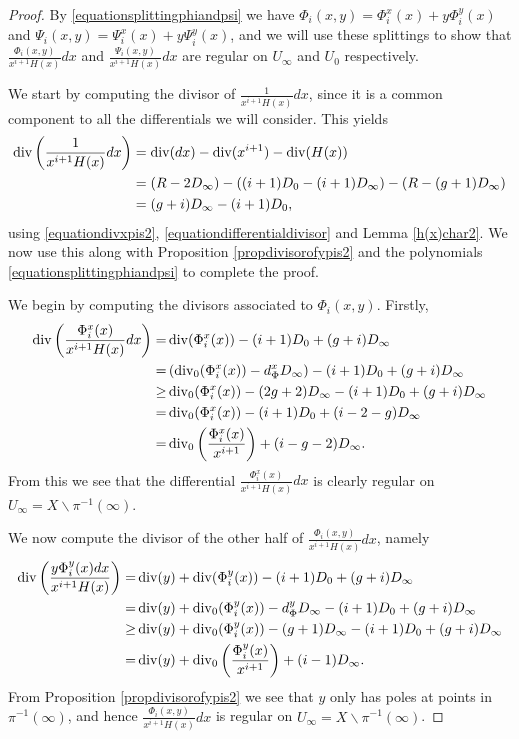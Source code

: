 \begin{proof}
    
    By \eqref{equationsplittingphiandpsi} we have $\Phi_i(x,y) = \Phi_i^x(x) + y\Phi_i^y(x)$ and $\Psi_i (x,y)= \Psi_i^x(x) + y\Psi_i^y(x)$, and we will use these splittings to show that $\frac{ \Phi_i(x,y) }{x^{i+1}H(x)}dx$ and $\frac{\Psi_i(x,y) }{x^{i+1}H(x)}dx$ are regular on $U_\infty$ and $U_0$ respectively.
    
    We start by computing the divisor of $\frac{1}{x^{i+1}H(x)}dx$, since it is a common component to all the differentials we will consider.
    This yields
        \begin{align*}
        \operatorname{div} \left( \frac{1}{x^{i+1}H(x)}dx \right) & = \operatorname{div}(dx) - \operatorname{div} (x^{i+1}) - \operatorname{div} (H(x)) \nonumber \\
        & = (R-2D_\infty) - ((i+1)D_0 - (i+1)D_\infty) - (R - (g+1)D_\infty) \nonumber \\
        & = (g+i)D_\infty - (i+1)D_0,
        \end{align*}
    using \eqref{equationdivxpis2}, \eqref{equationdifferentialdivisor}  and Lemma \ref{h(x)char2}.
    We now use this along with Proposition \ref{propdivisorofypis2} and the polynomials \eqref{equationsplittingphiandpsi} to complete the proof.
    
    We begin by computing the divisors associated to $\Phi_i(x,y)$.
    Firstly,
        \begin{align*}
        \operatorname{div} \left( \frac{\Phi_i^x(x) }{x^{i+1} H(x)}dx \right)  = &  \operatorname{div}(\Phi_i^x(x)) -(i+1)D_0 + (g+i)D_\infty\\
         = & \left( \operatorname{div}_0(\Phi_i^x(x)) -d_\Phi^xD_\infty\right) -(i+1)D_0 + (g+i)D_\infty\\
         \geq & \operatorname{div}_0(\Phi_i^x(x)) - (2g+2)D_\infty - (i+1)D_0 + (g+i)D_\infty \\
         = &  \operatorname{div}_0(\Phi_i^x(x)) - (i+1)D_0 + (i-2-g)D_\infty \\
         =  & \operatorname{div}_0 \left( \frac{\Phi_i^x(x)}{x^{i+1}} \right) + (i-g-2)D_\infty.
        \end{align*}
    From this we see that the differential $\frac{\Phi_i^x(x)}{x^{i+1}H(x)}dx$ is clearly regular on $U_\infty = X \backslash \pi^{-1}(\infty)$.
    
    We now compute the divisor of the other half of $\frac{\Phi_i(x,y)}{x^{i+1}H(x)}dx$, namely
        \begin{align*}
        \operatorname{div}\left(\frac{y\Phi_i^y(x) dx}{x^{i+1}H(x)} \right)  = & \operatorname{div}(y) + \operatorname{div}(\Phi_i^y(x)) -(i+1)D_0 + (g+i)D_\infty\\
         = & \operatorname{div}(y) + \operatorname{div}_0(\Phi_i^y(x)) - d_\Phi^yD_\infty -(i+1)D_0 + (g+i)D_\infty \\
         \geq & \operatorname{div}(y) + \operatorname{div}_0(\Phi_i^y(x)) - (g+1)D_\infty - (i+1)D_0 + (g+i)D_\infty \\
         = & \operatorname{div}(y) + \operatorname{div}_0\left(\frac{\Phi_i^y(x)}{x^{i+1}} \right) + (i-1)D_\infty.
        \end{align*}
    From Proposition \ref{propdivisorofypis2} we see that $y$ only has poles at points in $\pi^{-1}(\infty)$, and hence $\frac{\Phi_i(x,y) }{x^{i+1}H(x)}dx$ is regular on $U_\infty = X \backslash \pi^{-1}(\infty)$.
    

\end{proof}
